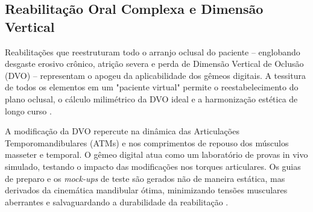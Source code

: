 \subsection{Reabilitação Oral Complexa e Dimensão Vertical}

Reabilitações que reestruturam todo o arranjo oclusal do paciente -- englobando desgaste erosivo crônico, atrição severa e perda de Dimensão Vertical de Oclusão (DVO) -- representam o apogeu da aplicabilidade dos gêmeos digitais. A tessitura de todos os elementos em um "paciente virtual" permite o reestabelecimento do plano oclusal, o cálculo milimétrico da DVO ideal e a harmonização estética de longo curso \cite{aisoc2026realising}.

A modificação da DVO repercute na dinâmica das Articulações Temporomandibulares (ATMs) e nos comprimentos de repouso dos músculos masseter e temporal. O gêmeo digital atua como um laboratório de provas in vivo simulado, testando o impacto das modificações nos torques articulares. Os guias de preparo e os \textit{mock-ups} de teste são gerados não de maneira estática, mas derivados da cinemática mandibular ótima, minimizando tensões musculares aberrantes e salvaguardando a durabilidade da reabilitação \cite{li2024aligner}.
